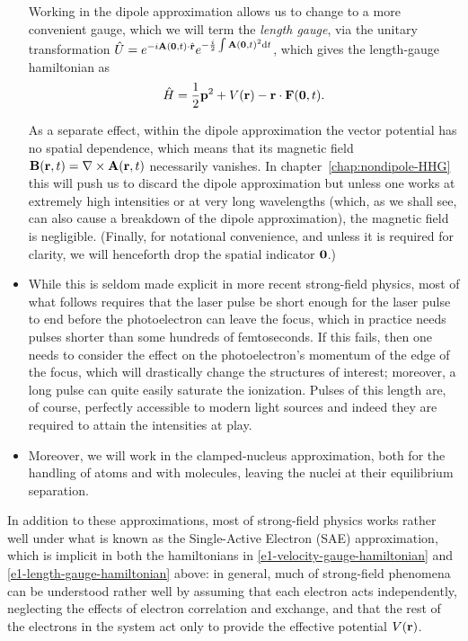 \begin{itemize}
Working in the dipole approximation allows us to change to a more convenient gauge, which we will term the \textit{length gauge}, via the unitary transformation $\hat U=e^{-i\vb{A}(\vb0,t)\cdot\hat{\vb{r}}} e^{-\frac i2\int \vb{A}(\vb0,t)^2\mathrm{d} t}$, which gives the length-gauge hamiltonian as 
\begin{equation}
\hat H = \frac{1}{2} \vb{p}^2 + V(\vb{r}) - \vb{r}\cdot\vb{F}(\vb0,t).
\label{e1-length-gauge-hamiltonian}
\end{equation}

As a separate effect, within the dipole approximation the vector potential has no spatial dependence, which means that its magnetic field $\vb B(\vb{r},t)=\nabla \times \vb{A}(\vb{r},t)$ necessarily vanishes. In chapter~\ref{chap:nondipole-HHG} this will push us to discard the dipole approximation but unless one works at extremely high intensities or at very long wavelengths (which, as we shall see, can also cause a breakdown of the dipole approximation), the magnetic field is negligible.  (Finally, for notational convenience, and unless it is required for clarity, we will henceforth drop the spatial indicator $\vb0$.)





\item While this is seldom made explicit in more recent strong-field physics, most of what follows requires that the laser pulse be short enough for the laser pulse to end before the photoelectron can leave the focus, which in practice needs pulses shorter than some hundreds of femtoseconds. If this fails, then one needs to consider the effect on the photoelectron's momentum of the edge of the focus, which will drastically change the structures of interest; moreover, a long pulse can quite easily saturate the ionization. Pulses of this length are, of course, perfectly accessible to modern light sources and indeed they are required to attain the intensities at play.


\item Moreover, we will work in the clamped-nucleus approximation, both for the handling of atoms and with molecules, leaving the nuclei at their equilibrium separation. 
\end{itemize}


In addition to these approximations, most of strong-field physics works rather well under what is known as the Single-Active Electron (SAE) approximation, which is implicit in both the hamiltonians in \eqref{e1-velocity-gauge-hamiltonian} and \eqref{e1-length-gauge-hamiltonian} above: in general, much of strong-field phenomena can be understood rather well by assuming that each electron acts independently, neglecting the effects of electron correlation and exchange, and that the rest of the electrons in the system act only to provide the effective potential $V(\vb{r})$.

